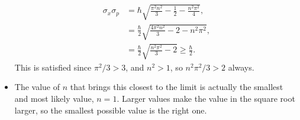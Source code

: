 \begin{example}
\begin{itemize}
            \begin{align*}
                \sigma_x \sigma_p &= \hbar \sqrt{\frac{\pi^2n^2}{3} - \frac{1}{2} - \frac{n^2\pi^2}{4}}, \\
                &= \frac{\hbar}{2} \sqrt{\frac{4\pi^2n^2}{3} - 2 - n^2\pi^2}, \\
                &= \frac{\hbar}{2} \sqrt{\frac{n^2\pi^2}{3} - 2} \geq \frac{\hbar}{2}.
            \end{align*}
            This is satisfied since $\pi^2/3 > 3$, and $n^2 > 1$, so $n^2\pi^2/3 > 2$ always.
        \item The value of $n$ that brings this closest to the limit is actually the smallest and most likely value, $n=1$. Larger values make the value in the square root larger, so the smallest possible value is the right one.
    \end{itemize}
\end{example}





